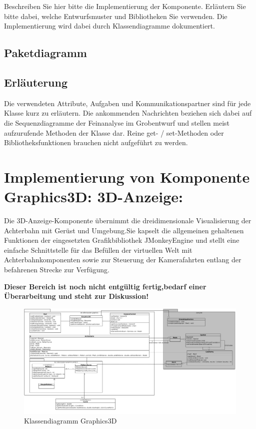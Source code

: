 Beschreiben Sie hier bitte die Implementierung der Komponente. Erläutern Sie
bitte dabei, welche Entwurfsmuster und Bibliotheken Sie verwenden. Die
Implementierung wird dabei durch Klassendiagramme dokumentiert.

\subsection{Paketdiagramm}
\subsection{Erläuterung}

Die verwendeten Attribute, Aufgaben und Kommunikationspartner sind für jede
Klasse kurz zu erläutern. Die ankommenden Nachrichten beziehen sich dabei auf
die Sequenzdiagramme der Feinanalyse im Grobentwurf und stellen meist
aufzurufende Methoden der Klasse dar.  Reine get- / set-Methoden oder
Bibliotheksfunktionen brauchen nicht aufgeführt zu werden.


\section{Implementierung von Komponente
         Graphics3D: 3D-Anzeige:}

Die  3D-Anzeige-Komponente übernimmt die dreidimensionale Visualisierung der Achterbahn
mit Gerüst und Umgebung.Sie kapselt die allgemeinen gehaltenen Funktionen der eingesetzten
Grafikbibliothek JMonkeyEngine und stellt eine einfache Schnittstelle für das Befüllen 
der virtuellen Welt mit Achterbahnkomponenten sowie zur Steuerung der Kamerafahrten 
entlang der befahrenen Strecke zur Verfügung.

\textbf {Dieser Bereich ist noch nicht entgültig fertig,bedarf einer Überarbeitung und steht zur Diskussion!}

\begin{figure}
\includegraphics[width=\linewidth]{bilder/klassendiagramm_006}
\caption{Klassendiagramm Graphics3D}
\end{figure}

